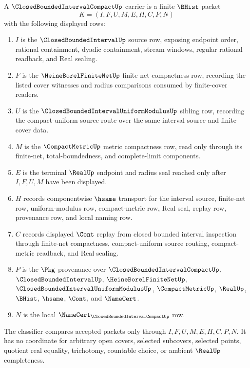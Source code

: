 \begin{definition}
\label{def:closed-bounded-interval-compact-carrier}
A $\ClosedBoundedIntervalCompactUp$ carrier is a finite $\BHist$ packet
$$
K=(I,F,U,M,E,H,C,P,N)
$$
with the following displayed rows:
\begin{enumerate}
\item $I$ is the $\ClosedBoundedIntervalUp$ source row, exposing endpoint order, rational containment, dyadic containment, stream windows, regular rational readback, and Real sealing.
\item $F$ is the $\HeineBorelFiniteNetUp$ finite-net compactness row, recording the listed cover witnesses and radius comparisons consumed by finite-cover readers.
\item $U$ is the $\ClosedBoundedIntervalUniformModulusUp$ sibling row, recording the compact-uniform source route over the same interval source and finite cover data.
\item $M$ is the $\CompactMetricUp$ metric compactness row, read only through its finite-net, total-boundedness, and complete-limit components.
\item $E$ is the terminal $\RealUp$ endpoint and radius seal reached only after $I,F,U,M$ have been displayed.
\item $H$ records componentwise $\hsame$ transport for the interval source, finite-net row, uniform-modulus row, compact-metric row, Real seal, replay row, provenance row, and local naming row.
\item $C$ records displayed $\Cont$ replay from closed bounded interval inspection through finite-net compactness, compact-uniform source routing, compact-metric readback, and Real sealing.
\item $P$ is the $\Pkg$ provenance over $\ClosedBoundedIntervalCompactUp$, $\ClosedBoundedIntervalUp$, $\HeineBorelFiniteNetUp$, $\ClosedBoundedIntervalUniformModulusUp$, $\CompactMetricUp$, $\RealUp$, $\BHist$, $\hsame$, $\Cont$, and $\NameCert$.
\item $N$ is the local $\NameCert_{\ClosedBoundedIntervalCompactUp}$ row.
\end{enumerate}
The classifier compares accepted packets only through $I,F,U,M,E,H,C,P,N$. It has no coordinate for arbitrary open covers, selected subcovers, selected points, quotient real equality, trichotomy, countable choice, or ambient $\RealUp$ completeness.
\end{definition}

